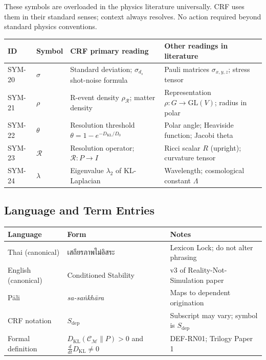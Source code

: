 \documentclass[12pt, a4paper]{article}
\begin{document}
\begin{whitebox}[title={SYM-20 to SYM-24 \textmd{---} Standard Physics}]
These symbols are overloaded in the physics literature universally.
CRF uses them in their standard senses; context always resolves.
No action required beyond standard physics conventions.

\medskip
\renewcommand{\arraystretch}{1.35}
\begin{tabular}{p{1.2cm} p{1.5cm} p{5.5cm} p{5.0cm}}
\toprule
\textbf{ID} & \textbf{Symbol} & \textbf{CRF primary reading} &
\textbf{Other readings in literature}\\
\midrule
SYM-20 & $\sigma$ &
  Standard deviation; $\sigma_{d_s}$ shot-noise formula &
  Pauli matrices $\sigma_{x,y,z}$; stress tensor\\
SYM-21 & $\rho$ &
  R-event density $\rho_\mathcal{R}$; matter density &
  Representation $\rho: G\to\text{GL}(V)$; radius in polar\\
SYM-22 & $\theta$ &
  Resolution threshold $\theta = 1-e^{-D_{\text{KL}}/D_0}$ &
  Polar angle; Heaviside function; Jacobi theta\\
SYM-23 & $\mathcal{R}$ &
  Resolution operator; $\mathcal{R}: P \to I$ &
  Ricci scalar $R$ (upright); curvature tensor\\
SYM-24 & $\lambda$ &
  Eigenvalue $\lambda_2$ of KL-Laplacian &
  Wavelength; cosmological constant $\Lambda$\\
\bottomrule
\end{tabular}
\end{whitebox}

\subsection{Language and Term Entries}

\begin{langbox}[title={LANG-01 \textmd{---} เสถียรภาพไม่อิสระ / Conditioned Stability / $S_{\text{dep}}$}]
\begin{center}
\renewcommand{\arraystretch}{1.35}
\begin{tabular}{p{3.5cm} p{3.5cm} p{5.5cm}}
\toprule
\textbf{Language} & \textbf{Form} & \textbf{Notes}\\
\midrule
Thai (canonical) & เสถียรภาพไม่อิสระ & Lexicon Lock; do not alter phrasing\\
English (canonical) & Conditioned Stability & v3 of Reality-Not-Simulation paper\\
Pāli & \emph{sa-saṅkhāra} & Maps to dependent origination\\
CRF notation & $S_{\text{dep}}$ & Subscript may vary; symbol is $S_{\text{dep}}$\\
Formal definition & $D_{\text{KL}}(\mathcal{C}_\mathcal{M}\|P) > 0$
  and $\frac{d}{dt}D_{\text{KL}} \neq 0$ & DEF-RN01; Trilogy Paper 1\\
\bottomrule
\end{tabular}
\end{center}
\end{langbox}
\end{document}
